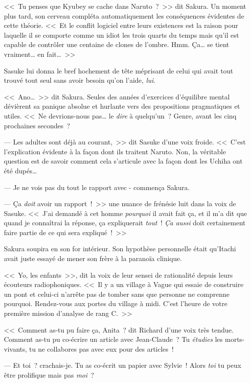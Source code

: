 <<~Tu penses que Kyubey se cache dans Naruto~?~>> dit Sakura. Un moment plus tard, son cerveau compléta automatiquement les conséquences évidentes de cette théorie. <<~Et le conflit logiciel entre leurs existences est la raison pour laquelle il se comporte comme un idiot les trois quarts du temps mais qu'il est capable de contrôler une centaine de clones de l'ombre. Hmm. Ça… se tient vraiment… en fait…~>>

Sasuke lui donna le bref hochement de tête méprisant de celui qui avait tout trouvé tout seul sans avoir besoin qu'on l'aide, \emph{lui}.

<<~Ano…~>> dit Sakura. Seules des années d'exercices d'équilibre mental dévièrent sa panique absolue et hurlante vers des propositions pragmatiques et utiles. <<~Ne devrions-nous pas… le \emph{dire} à quelqu'un~? Genre, avant les cinq prochaines secondes~?

--- Les adultes sont déjà au courant,~>> dit Sasuke d'une voix froide. <<~C'est l'explication évidente à la façon dont ils traitent Naruto. Non, la véritable question est de savoir comment cela s'articule avec la façon dont les Uchiha ont été dupés…

--- Je ne vois pas du tout le rapport avec - commença Sakura.

--- Ça \emph{doit} avoir un rapport~!~>> une nuance de frénésie luit dans la voix de Sasuke. <<~J'ai demandé à cet homme \emph{pourquoi} il avait fait ça, et il m'a dit que quand je connaîtrai la réponse, ça expliquerait \emph{tout}~! \emph{Ça aussi} doit certainement faire partie de ce qui sera expliqué~!~>>

Sakura soupira en son for intérieur. Son hypothèse personnelle était qu'Itachi avait juste essayé de mener son frère à la paranoïa clinique.

<<~Yo, les enfants~>>, dit la voix de leur sensei de rationalité depuis leurs écouteurs radiophoniques. <<~Il y a un village à Vague qui essaie de construire un pont et celui-ci n'arrête pas de tomber sans que personne ne comprenne pourquoi. Rendez-vous aux portes du village à midi. C'est l'heure de votre première mission d'analyse de rang C.~>>

\clearpage
{}

<<~Comment as-tu pu faire ça, Anita~? dit Richard d'une voix très tendue. Comment as-tu pu co-écrire un article avec Jean-Claude~? Tu \emph{étudies} les morts-vivants, tu ne collabores pas avec eux pour des articles~!

--- Et toi~? crachais-je. Tu as co-écrit un papier avec Sylvie~! Alors \emph{toi} tu peux être prolifique mais pas \emph{moi}~?

